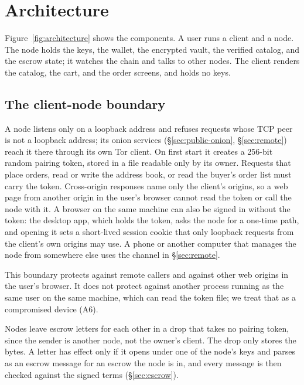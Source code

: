 \section{Architecture}
\label{sec:architecture}



Figure~\ref{fig:architecture} shows the components. A user runs a client and a node. The node holds the keys, the wallet, the encrypted vault, the verified catalog, and the escrow state; it watches the chain and talks to other nodes. The client renders the catalog, the cart, and the order screens, and holds no keys.

\subsection{The client-node boundary}

A node listens only on a loopback address and refuses requests whose TCP peer is not a loopback address; its onion services (\S\ref{sec:public-onion}, \S\ref{sec:remote}) reach it there through its own Tor client. On first start it creates a 256-bit random pairing token, stored in a file readable only by its owner. Requests that place orders, read or write the address book, or read the buyer's order list must carry the token. Cross-origin responses name only the client's origins, so a web page from another origin in the user's browser cannot read the token or call the node with it. A browser on the same machine can also be signed in without the token: the desktop app, which holds the token, asks the node for a one-time path, and opening it sets a short-lived session cookie that only loopback requests from the client's own origins may use. A phone or another computer that manages the node from somewhere else uses the channel in \S\ref{sec:remote}.

This boundary protects against remote callers and against other web origins in the user's browser. It does not protect against another process running as the same user on the same machine, which can read the token file; we treat that as a compromised device (A6).

Nodes leave escrow letters for each other in a drop that takes no pairing token, since the sender is another node, not the owner's client. The drop only stores the bytes. A letter has effect only if it opens under one of the node's keys and parses as an escrow message for an escrow the node is in, and every message is then checked against the signed terms (\S\ref{sec:escrow}).

